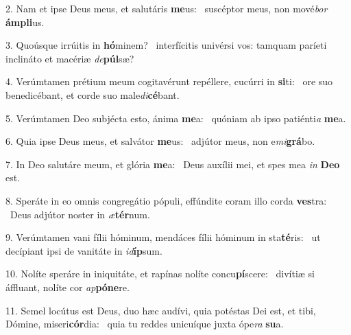 2. Nam et ipse Deus meus, et salutáris \textbf{me}us: \ast\  suscéptor meus, non mové\textit{bor} \textbf{ám}\textbf{pli}us.\

3. Quoúsque irrúitis in \textbf{hó}minem? \ast\  interfícitis univérsi vos: tamquam paríeti inclináto et macériæ \textit{de}\textbf{púl}sæ?\

4. Verúmtamen prétium meum cogitavérunt repéllere, cucúrri in \textbf{si}ti: \ast\  ore suo benedicébant, et corde suo male\textit{di}\textbf{cé}bant.\

5. Verúmtamen Deo subjécta esto, ánima \textbf{me}a: \ast\  quóniam ab ipso patiénti\textit{a} \textbf{me}a.\

6. Quia ipse Deus meus, et salvátor \textbf{me}us: \ast\  adjútor meus, non e\textit{mi}\textbf{grá}bo.\

7. In Deo salutáre meum, et glória \textbf{me}a: \ast\  Deus auxílii mei, et spes mea \textit{in} \textbf{De}\textbf{o} est.\

8. Speráte in eo omnis congregátio pópuli, effúndite coram illo corda \textbf{ves}tra: \ast\  Deus adjútor noster in \textit{æ}\textbf{tér}num.\

9. Verúmtamen vani fílii hóminum, mendáces fílii hóminum in sta\textbf{té}ris: \ast\  ut decípiant ipsi de vanitáte in \textit{id}\textbf{íp}sum.\

10. Nolíte speráre in iniquitáte, et rapínas nolíte concu\textbf{pí}scere: \ast\  divítiæ si áffluant, nolíte cor \textit{ap}\textbf{pó}\textbf{ne}re.\

11. Semel locútus est Deus, duo hæc audívi, quia potéstas Dei est, et tibi, Dómine, miseri\textbf{cór}dia: \ast\  quia tu reddes unicuíque juxta ópe\textit{ra} \textbf{su}a.\


